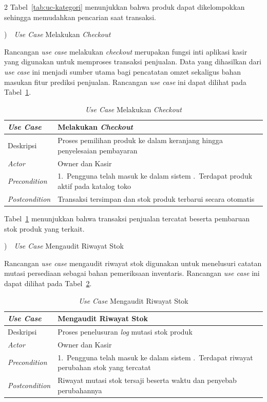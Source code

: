 \documentclass[12pt, a4paper, onecolumn, oneside]{report}
\begin{document}
\begin{spacing}{2}
Tabel~\ref{tab:uc-kategori} menunjukkan bahwa produk dapat dikelompokkan sehingga memudahkan pencarian saat transaksi.

)~~\textit{Use Case} Melakukan \textit{Checkout}

Rancangan \textit{use case} melakukan \textit{checkout} merupakan fungsi inti aplikasi kasir yang digunakan untuk memproses transaksi penjualan. Data yang dihasilkan dari \textit{use case} ini menjadi sumber utama bagi pencatatan omzet sekaligus bahan masukan fitur prediksi penjualan. Rancangan \textit{use case} ini dapat dilihat pada Tabel~\ref{tab:uc-checkout}.

\begin{table}[H]
\centering
\caption{\textit{Use Case} Melakukan \textit{Checkout}}
\label{tab:uc-checkout}
\begin{tabularx}{\textwidth}{|p{3.2cm}|X|}
\hline
\textbf{\textit{Use Case}} & \textbf{Melakukan \textit{Checkout}} \\ \hline
Deskripsi & Proses pemilihan produk ke dalam keranjang hingga penyelesaian pembayaran \\ \hline
\textit{Actor} & Owner dan Kasir \\ \hline
\textit{Precondition} & 1.~Pengguna telah masuk ke dalam sistem \newline 2.~Terdapat produk aktif pada katalog toko \\ \hline
\textit{Postcondition} & Transaksi tersimpan dan stok produk terbarui secara otomatis \\ \hline
\end{tabularx}
\end{table}

Tabel~\ref{tab:uc-checkout} menunjukkan bahwa transaksi penjualan tercatat beserta pembaruan stok produk yang terkait.

)~~\textit{Use Case} Mengaudit Riwayat Stok

Rancangan \textit{use case} mengaudit riwayat stok digunakan untuk menelusuri catatan mutasi persediaan sebagai bahan pemeriksaan inventaris. Rancangan \textit{use case} ini dapat dilihat pada Tabel~\ref{tab:uc-stok}.

\begin{table}[H]
\centering
\caption{\textit{Use Case} Mengaudit Riwayat Stok}
\label{tab:uc-stok}
\begin{tabularx}{\textwidth}{|p{3.2cm}|X|}
\hline
\textbf{\textit{Use Case}} & \textbf{Mengaudit Riwayat Stok} \\ \hline
Deskripsi & Proses penelusuran \textit{log} mutasi stok produk \\ \hline
\textit{Actor} & Owner dan Kasir \\ \hline
\textit{Precondition} & 1.~Pengguna telah masuk ke dalam sistem \newline 2.~Terdapat riwayat perubahan stok yang tercatat \\ \hline
\textit{Postcondition} & Riwayat mutasi stok tersaji beserta waktu dan penyebab perubahannya \\ \hline
\end{tabularx}
\end{table}


\end{spacing}
\end{document}
